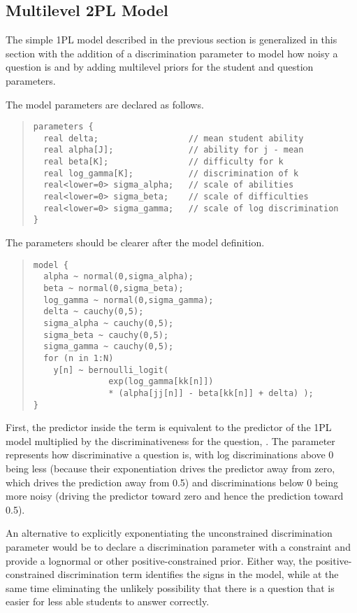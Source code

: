 \subsection{Multilevel 2PL Model}

The simple 1PL model described in the previous section is generalized
in this section with the addition of a discrimination parameter to
model how noisy a question is and by adding multilevel priors for the
student and question parameters.

The model parameters are declared as follows.
%
\begin{quote}
\begin{Verbatim}[fontsize=\small]
parameters {    
  real delta;                  // mean student ability
  real alpha[J];               // ability for j - mean
  real beta[K];                // difficulty for k
  real log_gamma[K];           // discrimination of k
  real<lower=0> sigma_alpha;   // scale of abilities
  real<lower=0> sigma_beta;    // scale of difficulties 
  real<lower=0> sigma_gamma;   // scale of log discrimination
}
\end{Verbatim}
\end{quote}
%
The parameters should be clearer after the model definition.
%
\begin{quote}
\begin{Verbatim}[fontsize=\small]
model {
  alpha ~ normal(0,sigma_alpha); 
  beta ~ normal(0,sigma_beta);   
  log_gamma ~ normal(0,sigma_gamma);
  delta ~ cauchy(0,5);
  sigma_alpha ~ cauchy(0,5);
  sigma_beta ~ cauchy(0,5);
  sigma_gamma ~ cauchy(0,5);
  for (n in 1:N)
    y[n] ~ bernoulli_logit( 
               exp(log_gamma[kk[n]])
               * (alpha[jj[n]] - beta[kk[n]] + delta) );
}
\end{Verbatim}
\end{quote}
%
First, the predictor inside the  term is
equivalent to the predictor of the 1PL model multiplied by the
discriminativeness for the question, .
The parameter  represents how discriminative a
question is, with log discriminations above 0 being less (because
their exponentiation drives the predictor away from zero, which drives
the prediction away from 0.5) and discriminations below 0 being more
noisy (driving the predictor toward zero and hence the prediction
toward 0.5).

An alternative to explicitly exponentiating the unconstrained
discrimination parameter  would be to declare a
discrimination parameter  with a constraint
 and provide a lognormal or other positive-constrained
prior.  Either way, the positive-constrained discrimination term
identifies the signs in the model, while at the same time eliminating
the unlikely possibility that there is a question that is easier for
less able students to answer correctly.

